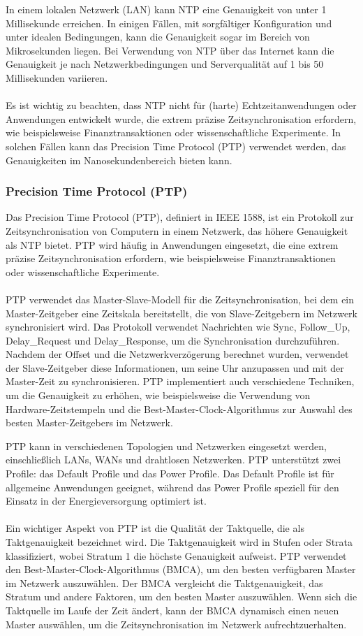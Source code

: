 In einem lokalen Netzwerk (LAN) kann NTP eine Genauigkeit von unter 1 Millisekunde erreichen. In einigen Fällen, mit sorgfältiger Konfiguration und unter idealen Bedingungen, kann die Genauigkeit sogar im Bereich von Mikrosekunden liegen. Bei Verwendung von NTP über das Internet kann die Genauigkeit je nach Netzwerkbedingungen und Serverqualität auf 1 bis 50 Millisekunden variieren.
\\\\
Es ist wichtig zu beachten, dass NTP nicht für (harte) Echtzeitanwendungen oder Anwendungen entwickelt wurde, die extrem präzise Zeitsynchronisation erfordern, wie beispielsweise Finanztransaktionen oder wissenschaftliche Experimente. In solchen Fällen kann das Precision Time Protocol (PTP) verwendet werden, das Genauigkeiten im Nanosekundenbereich bieten kann.

\subsubsection{Precision Time Protocol (PTP)}

Das Precision Time Protocol (PTP), definiert in IEEE 1588, ist ein Protokoll zur Zeitsynchronisation von Computern in einem Netzwerk, das höhere Genauigkeit als NTP bietet. PTP wird häufig in Anwendungen eingesetzt, die eine extrem präzise Zeitsynchronisation erfordern, wie beispielsweise Finanztransaktionen oder wissenschaftliche Experimente.
\\\\
PTP verwendet das Master-Slave-Modell für die Zeitsynchronisation, bei dem ein Master-Zeitgeber eine Zeitskala bereitstellt, die von Slave-Zeitgebern im Netzwerk synchronisiert wird. Das Protokoll verwendet Nachrichten wie Sync, Follow\_Up, Delay\_Request und Delay\_Response, um die Synchronisation durchzuführen.
Nachdem der Offset und die Netzwerkverzögerung berechnet wurden, verwendet der Slave-Zeitgeber diese Informationen, um seine Uhr anzupassen und mit der Master-Zeit zu synchronisieren. PTP implementiert auch verschiedene Techniken, um die Genauigkeit zu erhöhen, wie beispielsweise die Verwendung von Hardware-Zeitstempeln und die Best-Master-Clock-Algorithmus zur Auswahl des besten Master-Zeitgebers im Netzwerk.

PTP kann in verschiedenen Topologien und Netzwerken eingesetzt werden, einschließlich LANs, WANs und drahtlosen Netzwerken. PTP unterstützt zwei Profile: das Default Profile und das Power Profile. Das Default Profile ist für allgemeine Anwendungen geeignet, während das Power Profile speziell für den Einsatz in der Energieversorgung optimiert ist.
\\\\
Ein wichtiger Aspekt von PTP ist die Qualität der Taktquelle, die als Taktgenauigkeit bezeichnet wird. Die Taktgenauigkeit wird in Stufen oder Strata klassifiziert, wobei Stratum 1 die höchste Genauigkeit aufweist. PTP verwendet den Best-Master-Clock-Algorithmus (BMCA), um den besten verfügbaren Master im Netzwerk auszuwählen. Der BMCA vergleicht die Taktgenauigkeit, das Stratum und andere Faktoren, um den besten Master auszuwählen. Wenn sich die Taktquelle im Laufe der Zeit ändert, kann der BMCA dynamisch einen neuen Master auswählen, um die Zeitsynchronisation im Netzwerk aufrechtzuerhalten.

